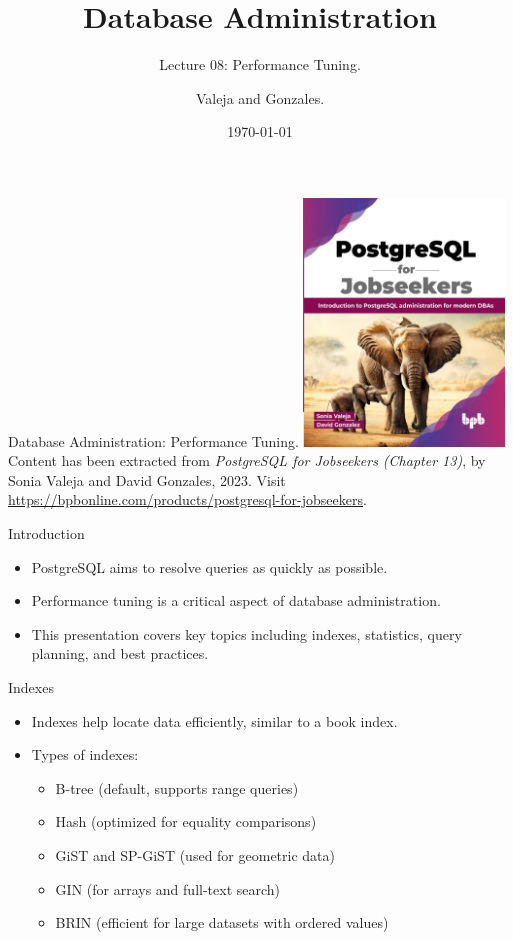 \documentclass{beamer}
\title[Performance Tuning]{Database Administration}
\subtitle{Lecture 08: Performance Tuning.}
\author{Valeja and Gonzales.}
\date{\today}
\begin{document}
\frame{\titlepage}

\begin{frame}{Database Administration: Performance Tuning.}
    \centering
    \includegraphics[width=0.4\textwidth]{figures/book_cover}\\
    \vspace{2mm}
    {
        \scriptsize
        Content has been extracted from \textit{PostgreSQL for Jobseekers (Chapter 13)}, by Sonia Valeja and David Gonzales, 2023.  Visit \url{https://bpbonline.com/products/postgresql-for-jobseekers}.\\
    }
\end{frame}

\begin{frame}{Introduction}
    \begin{itemize}
        \item PostgreSQL aims to resolve queries as quickly as possible.
        \item Performance tuning is a critical aspect of database administration.
        \item This presentation covers key topics including indexes, statistics, query planning, and best practices.
    \end{itemize}
\end{frame}

\begin{frame}{Indexes}
    \begin{itemize}
        \item Indexes help locate data efficiently, similar to a book index.
        \item Types of indexes:
        \begin{itemize}
            \item B-tree (default, supports range queries)
            \item Hash (optimized for equality comparisons)
            \item GiST and SP-GiST (used for geometric data)
            \item GIN (for arrays and full-text search)
            \item BRIN (efficient for large datasets with ordered values)
        \end{itemize}
    \end{itemize}
\end{frame}
\end{document}
